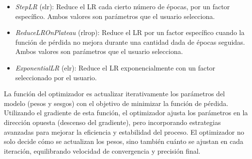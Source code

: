 \begin{itemize}
    \item \emph{StepLR} (slr): Reduce el LR cada cierto número de épocas, por un factor específico. Ambos valores son parámetros que el usuario selecciona.
    
    \item \emph{ReduceLROnPlateau} (rlrop): Reduce el LR por un factor específico cuando la función de pérdida no mejora durante una cantidad dada de épocas seguidas. Ambos valores son parámetros que el usuario selecciona.

    \item \emph{ExponentialLR} (elr): Reduce el LR exponencialmente con un factor seleccionado por el usuario.
\end{itemize}


La función del optimizador es actualizar iterativamente los parámetros del modelo (pesos y sesgos) con el objetivo de minimizar la función de pérdida. Utilizando el gradiente de esta función, el optimizador ajusta los parámetros en la dirección opuesta (descenso del gradiente), pero incorporando estrategias avanzadas para mejorar la eficiencia y estabilidad del proceso. El optimizador no solo decide cómo se actualizan los pesos, sino también cuánto se ajustan en cada iteración, equilibrando velocidad de convergencia y precisión final.

